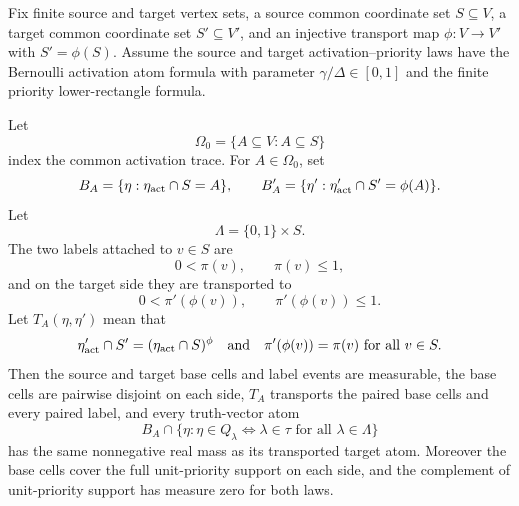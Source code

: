 \begin{helper}
Fix finite source and target vertex sets, a source common coordinate set
\(S\subseteq V\), a target common coordinate set \(S'\subseteq V'\), and an
injective transport map \(\phi:V\to V'\) with \(S'=\phi(S)\).  Assume the
source and target activation--priority laws have the Bernoulli activation
atom formula with parameter \(\gamma/\Delta\in[0,1]\) and the finite priority
lower-rectangle formula.

Let
\[
  \Omega_0=\{A\subseteq V:A\subseteq S\}
\]
index the common activation trace.  For \(A\in\Omega_0\), set
\[
  B_A=\{\eta:\eta_{\rm act}\cap S=A\},\qquad
  B'_A=\{\eta':\eta'_{\rm act}\cap S'=\phi(A)\}.
\]
Let
\[
  \Lambda=\{0,1\}\times S.
\]
The two labels attached to \(v\in S\) are
\[
  0<\pi(v),\qquad \pi(v)\le 1,
\]
and on the target side they are transported to
\[
  0<\pi'(\phi(v)),\qquad \pi'(\phi(v))\le 1.
\]
Let \(T_A(\eta,\eta')\) mean that
\[
  \eta'_{\rm act}\cap S'=(\eta_{\rm act}\cap S)^\phi
  \quad\text{and}\quad
  \pi'(\phi(v))=\pi(v)\ \text{for all }v\in S.
\]
Then the source and target base cells and label events are measurable, the
base cells are pairwise disjoint on each side, \(T_A\) transports the paired
base cells and every paired label, and every truth-vector atom
\[
  B_A\cap\{\eta:\eta\in Q_\lambda\Longleftrightarrow \lambda\in\tau
        \text{ for all }\lambda\in\Lambda\}
\]
has the same nonnegative real mass as its transported target atom.  Moreover
the base cells cover the full unit-priority support on each side, and the
complement of unit-priority support has measure zero for both laws.
\end{helper}
